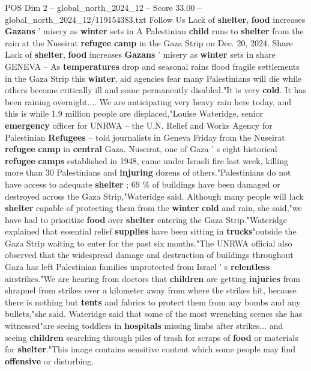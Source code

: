 \begin{textsample}{POS Dim 2 – global\_north\_2024\_12 – Score 33.00 – global\_north\_2024\_12/119154383.txt}  \label{ex:f2_pos_182}
Follow Us Lack of \textbf{shelter}, \textbf{food} increases \textbf{Gazans} ' misery as \textbf{winter} sets in A Palestinian \textbf{child} runs to \textbf{shelter} from the rain at the Nuseirat \textbf{refugee} \textbf{camp} in the Gaza Strip on Dec. 20, 2024.
Share Lack of \textbf{shelter}, \textbf{food} increases \textbf{Gazans} ' misery as \textbf{winter} sets in share GENEVA -- As \textbf{temperatures} drop and seasonal rains flood fragile settlements in the Gaza Strip this \textbf{winter}, aid agencies fear many Palestinians will die while others become critically ill and some permanently disabled."It is very \textbf{cold}.
It has been raining overnight....
We are anticipating very heavy rain here today, and this is while 1.9 million people are displaced,"Louise Wateridge, senior \textbf{emergency} officer for UNRWA -- the U.N.
Relief and Works Agency for Palestinian \textbf{Refugees} -- told journalists in Geneva Friday from the Nuseirat \textbf{refugee} \textbf{camp} in \textbf{central} Gaza.
Nuseirat, one of Gaza ' s eight historical \textbf{refugee} \textbf{camps} established in 1948, came under Israeli fire last week, killing more than 30 Palestinians and \textbf{injuring} dozens of others."Palestinians do not have access to adequate \textbf{shelter} ; 69 \% of buildings have been damaged or destroyed across the Gaza Strip,"Wateridge said.
Although many people will lack \textbf{shelter} capable of protecting them from the \textbf{winter} \textbf{cold} and rain, she said,"we have had to prioritize \textbf{food} over \textbf{shelter} entering the Gaza Strip."Wateridge explained that essential relief \textbf{supplies} have been sitting in \textbf{trucks}"outside the Gaza Strip waiting to enter for the past six months."The UNRWA official also observed that the widespread damage and destruction of buildings throughout Gaza has left Palestinian families unprotected from Israel ' s \textbf{relentless} airstrikes."We are hearing from doctors that \textbf{children} are getting \textbf{injuries} from shrapnel from strikes over a kilometer away from where the strikes hit, because there is nothing but \textbf{tents} and fabrics to protect them from any bombs and any bullets,"she said.
Wateridge said that some of the most wrenching scenes she has witnessed"are seeing toddlers in \textbf{hospitals} missing limbs after strikes... and seeing \textbf{children} searching through piles of trash for scraps of \textbf{food} or materials for \textbf{shelter}."This image contains sensitive content which some people may find \textbf{offensive} or disturbing.

\end{textsample}
